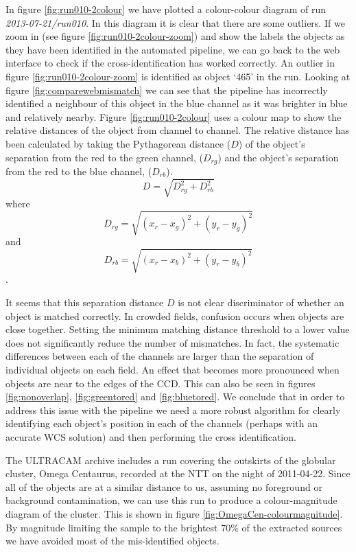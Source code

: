 In figure \ref{fig:run010-2colour} we have plotted a colour-colour diagram of run \emph{2013-07-21/run010}. In this diagram it is clear that there are some outliers. If we zoom in (see figure \ref{fig:run010-2colour-zoom}) and show the labels the objects as they have been identified in the automated pipeline, we can go back to the web interface to check if the cross-identification has worked correctly. An outlier in figure \ref{fig:run010-2colour-zoom} is identified as object `465' in the run. Looking at figure \ref{fig:comparewebmismatch} we can see that the pipeline has incorrectly identified a neighbour of this object in the blue channel as it was brighter in blue and relatively nearby. Figure \ref{fig:run010-2colour} uses a colour map to show the relative distances of the object from channel to channel. The relative distance has been calculated by taking the Pythagorean distance ($D$) of the object's separation from the red to the green channel, ($D_{rg}$) and the object's separation from the red to the blue channel, ($D_{rb}$).  \begin{equation}D = \sqrt{ D_{rg}^2 + D_{rb}^2}\end{equation}where \begin{equation}D_{rg} = \sqrt{ (x_r - x_g)^2 + (y_r - y_g)^2}\end{equation} and \begin{equation}D_{rb} = \sqrt{ (x_r - x_b)^2 + (y_r - y_b)^2} \end{equation}.

It seems that this separation distance $D$ is not clear discriminator of whether an object is matched correctly. In crowded fields, confusion occurs when objects are close together. Setting the minimum matching distance threshold to a lower value does not significantly reduce the number of mismatches. In fact, the systematic differences between each of the channels are larger than the separation of individual objects on each field. An effect that becomes more pronounced when objects are near to the edges of the CCD. This can also be seen in figures  \ref{fig:nonoverlap}, \ref{fig:greentored} and \ref{fig:bluetored}.  We conclude that in order to address this issue with the pipeline we need a more robust algorithm for clearly identifying each object's position in each of the channels (perhaps with an accurate WCS solution) and then performing the cross identification. 

The ULTRACAM archive includes a run covering the outskirts of the globular cluster, Omega Centaurus, recorded at the NTT on the night of 2011-04-22.  Since all of the objects are at a similar distance to us, assuming no foreground or background contamination, we can use this run to produce a colour-magnitude diagram of the cluster. This is shown in  figure \ref{fig:OmegaCen-colourmagnitude}. By magnitude limiting the sample to the brightest 70\% of the extracted sources we have avoided most of the mis-identified objects. 

